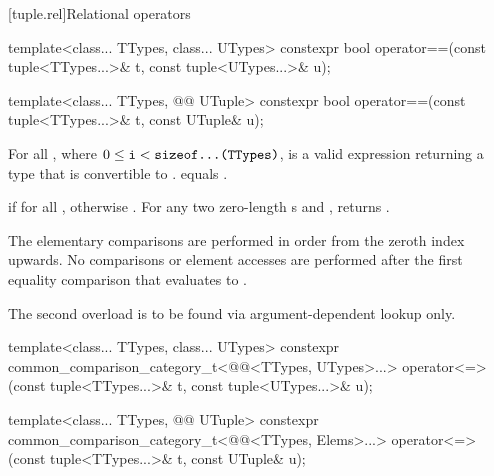 \documentclass{wg21}
\begin{document}
[tuple.rel]{Relational operators}

%
\begin{itemdecl}
template<class... TTypes, class... UTypes>
constexpr bool operator==(const tuple<TTypes...>& t, const tuple<UTypes...>& u);
\end{itemdecl}
\begin{addedblock}
\begin{itemdecl}
template<class... TTypes, @@ UTuple>
constexpr bool operator==(const tuple<TTypes...>& t, const UTuple& u);
\end{itemdecl}
\end{addedblock}

\begin{itemdescr}
    \pnum
    \mandates
    For all ,
    where $0 \leq \texttt{i} < \texttt{sizeof...(TTypes)}$,
     is a valid expression
    returning a type that is convertible to .
     equals
    .

    \pnum
    \returns
     if  for all
    , otherwise .
    \added{[Note:}
    For any two zero-length s  and ,  returns .
    \added{]}

    \pnum
    \remarks
    The elementary comparisons are performed in order from the
    zeroth index upwards.  No comparisons or element accesses are
    performed after the first equality comparison that evaluates to
    .

    \begin{addedblock}
    \remarks The second overload is to be found via argument-dependent lookup only.
    \end{addedblock}

\end{itemdescr}

%
\begin{itemdecl}
template<class... TTypes, class... UTypes>
constexpr common_comparison_category_t<@@<TTypes, UTypes>...>
operator<=>(const tuple<TTypes...>& t, const tuple<UTypes...>& u);
\end{itemdecl}
\begin{addedblock}
\begin{itemdecl}
template<class... TTypes, @@ UTuple>
constexpr common_comparison_category_t<@@<TTypes, Elems>...>
operator<=>(const tuple<TTypes...>& t, const UTuple& u);
\end{itemdecl}
\end{addedblock}
\end{document}

